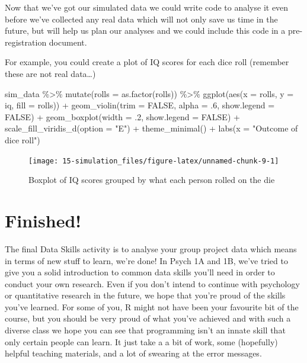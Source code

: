 \documentclass[
  oneside]{book}
\newenvironment{Shaded}{\begin{snugshade}}{\end{snugshade}}
\newcommand{\AttributeTok}[1]{\textcolor[rgb]{0.77,0.63,0.00}{#1}}
\newcommand{\ConstantTok}[1]{\textcolor[rgb]{0.00,0.00,0.00}{#1}}
\newcommand{\DecValTok}[1]{\textcolor[rgb]{0.00,0.00,0.81}{#1}}
\newcommand{\FunctionTok}[1]{\textcolor[rgb]{0.00,0.00,0.00}{#1}}
\newcommand{\NormalTok}[1]{#1}
\newcommand{\SpecialCharTok}[1]{\textcolor[rgb]{0.00,0.00,0.00}{#1}}
\newcommand{\StringTok}[1]{\textcolor[rgb]{0.31,0.60,0.02}{#1}}
\begin{document}
Now that we've got our simulated data we could write code to analyse it even before we've collected any real data which will not only save us time in the future, but will help us plan our analyses and we could include this code in a pre-registration document.

For example, you could create a plot of IQ scores for each dice roll (remember these are not real data\ldots)

\begin{Shaded}
\begin{Highlighting}[]
\NormalTok{sim\_data }\SpecialCharTok{\%\textgreater{}\%}
  \FunctionTok{mutate}\NormalTok{(}\AttributeTok{rolls =} \FunctionTok{as.factor}\NormalTok{(rolls)) }\SpecialCharTok{\%\textgreater{}\%}
  \FunctionTok{ggplot}\NormalTok{(}\FunctionTok{aes}\NormalTok{(}\AttributeTok{x =}\NormalTok{ rolls, }\AttributeTok{y =}\NormalTok{ iq, }\AttributeTok{fill =}\NormalTok{ rolls)) }\SpecialCharTok{+}
  \FunctionTok{geom\_violin}\NormalTok{(}\AttributeTok{trim =} \ConstantTok{FALSE}\NormalTok{, }\AttributeTok{alpha =}\NormalTok{ .}\DecValTok{6}\NormalTok{, }\AttributeTok{show.legend =} \ConstantTok{FALSE}\NormalTok{) }\SpecialCharTok{+}
  \FunctionTok{geom\_boxplot}\NormalTok{(}\AttributeTok{width =}\NormalTok{ .}\DecValTok{2}\NormalTok{, }\AttributeTok{show.legend =} \ConstantTok{FALSE}\NormalTok{) }\SpecialCharTok{+}
  \FunctionTok{scale\_fill\_viridis\_d}\NormalTok{(}\AttributeTok{option =} \StringTok{"E"}\NormalTok{) }\SpecialCharTok{+}
  \FunctionTok{theme\_minimal}\NormalTok{() }\SpecialCharTok{+}
  \FunctionTok{labs}\NormalTok{(}\AttributeTok{x =} \StringTok{"Outcome of dice roll"}\NormalTok{)}
\end{Highlighting}
\end{Shaded}

\begin{figure}

{\centering \texttt{[image: 15-simulation\_files/figure-latex/unnamed-chunk-9-1]} 

}

\caption{Boxplot of IQ scores grouped by what each person rolled on the die}\label{fig:unnamed-chunk-9}
\end{figure}

\hypertarget{finished-6}{%
\section{Finished!}\label{finished-6}}

The final Data Skills activity is to analyse your group project data which means in terms of new stuff to learn, we're done! In Psych 1A and 1B, we've tried to give you a solid introduction to common data skills you'll need in order to conduct your own research. Even if you don't intend to continue with psychology or quantitative research in the future, we hope that you're proud of the skills you've learned. For some of you, R might not have been your favourite bit of the course, but you should be very proud of what you've achieved and with such a diverse class we hope you can see that programming isn't an innate skill that only certain people can learn. It just take a a bit of work, some (hopefully) helpful teaching materials, and a lot of swearing at the error messages.
\end{document}
